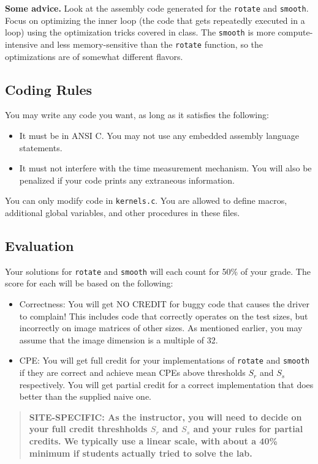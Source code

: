 \documentclass[11pt]{article}
\begin{document}
{\bf Some advice.} Look at the assembly code generated for the
\texttt{rotate} and \texttt{smooth}. Focus on optimizing the inner
loop (the code that gets repeatedly executed in a loop) using the
optimization tricks covered in class.  The \texttt{smooth} is more
compute-intensive and less memory-sensitive than the \texttt{rotate}
function, so the optimizations are of somewhat different flavors.

\subsection*{Coding Rules}
You may write any code you want, as long as it satisfies the following:
\begin{itemize}
\item
It must be in ANSI C.  You may not use any embedded assembly language
statements.
\item
It must not interfere with the time measurement mechanism.  You will
also be penalized if your code prints any extraneous information.
\end{itemize}
You can only modify code in {\tt kernels.c}.  You
are allowed to define macros, additional global variables, and other
procedures in these files.

\subsection*{Evaluation}

Your solutions for {\tt rotate} and {\tt smooth} will each count
for 50\% of your grade. The score for each will be based on the following:
\begin{itemize}

\item Correctness: You will get NO CREDIT for buggy code that causes
the driver to complain! This includes code that correctly operates on
the test sizes, but incorrectly on image matrices of other sizes. As
mentioned earlier, you may assume that the image dimension is a
multiple of 32.

\item CPE: You will get full credit for your implementations of
\texttt{rotate} and \texttt{smooth} if they are correct and achieve
mean CPEs above thresholds $S_r$ and $S_s$
respectively.  You will get partial credit for a correct
implementation that does better than the supplied naive one.
\end{itemize}

\begin{quote}
\bf SITE-SPECIFIC: As the instructor, you will need to decide on your
full credit threshholds $S_r$ and $S_s$ and your rules for partial
credits. We typically use a linear scale, with about a 40\% minimum if
students actually tried to solve the lab.
\end{quote}
\end{document}
